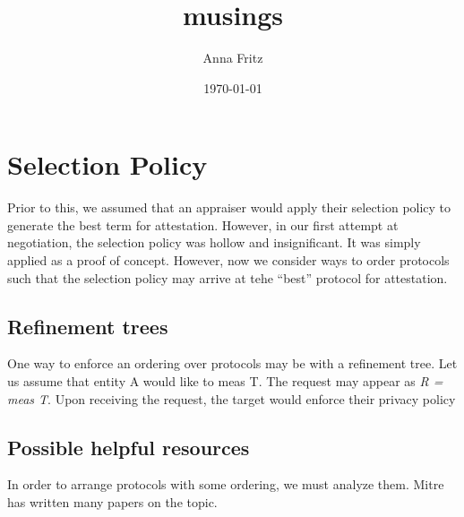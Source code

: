 \documentclass[12pt, letterpaper]{article}
\title{musings}
\author{Anna Fritz}
\date{\today}
\begin{document}
\maketitle
\section{Selection Policy}

Prior to this, we assumed that an appraiser would apply their selection policy to generate the best term for attestation. However, in our first attempt at negotiation, the selection policy was hollow and insignificant. It was simply applied as a proof of concept. However, now we consider ways to order protocols such that the selection policy may arrive at tehe ``best'' protocol for attestation. 

\subsection{Refinement trees}

One way to enforce an ordering over protocols may be with a refinement tree. Let us assume that entity A would like to meas T. The request may appear as \emph{R = {meas T}}. Upon receiving the request, the target would enforce their privacy policy 

\begin{figure}



\end{figure}

\subsection {Possible helpful resources}

In order to arrange protocols with some ordering, we must analyze them. Mitre has written many papers on the topic. 
\end{document}
